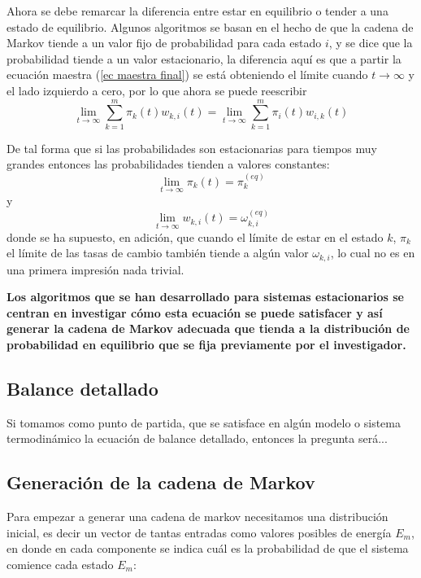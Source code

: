 \documentclass[12pt]{book}
\begin{document}
Ahora se debe remarcar la diferencia entre estar en equilibrio o tender a una estado de equilibrio. Algunos algoritmos se basan en el hecho de que la cadena de Markov tiende a un valor fijo de probabilidad para cada estado $i$, y se dice que la probabilidad tiende a un valor estacionario, la diferencia aquí es que a partir la ecuación maestra (\ref{ec maestra final}) se está obteniendo el límite  cuando $t \rightarrow \infty$ y el lado izquierdo a cero, por lo que ahora se puede reescribir
\begin{equation}
\lim_{t \rightarrow \infty}\sum_{k=1}^{m} \pi_{k}(t)  w_{k,i}(t) = \lim_{t \rightarrow \infty} \sum_{k=1}^{m} \pi_{i}(t)  w_{i,k}(t)
\end{equation}

De tal forma que si las probabilidades son estacionarias para tiempos muy grandes entonces las probabilidades tienden a valores constantes: 
\begin{equation}
	\lim_{t \rightarrow \infty}  \pi_{k}(t) = \pi_{k}^{(eq)}
\end{equation}
y
\begin{equation}
	\lim_{t \rightarrow \infty}  w_{k,i}(t) = \omega_{k,i}^{(eq)}
\end{equation}
donde se ha supuesto, en adición, que cuando el límite de estar en el estado $k$, $ \pi_{k}$ el límite de las tasas de cambio también tiende a algún valor $\omega_{k,i}$, lo cual no es en una primera impresión nada trivial.

\textbf{Los algoritmos que se han desarrollado para sistemas estacionarios se centran en investigar cómo esta ecuación se puede satisfacer y así generar la cadena de Markov adecuada que tienda a la distribución de probabilidad en equilibrio que se fija previamente por el investigador.}

\subsection{Balance detallado}

Si tomamos como punto de partida, que se  satisface en algún modelo o sistema termodinámico la ecuación de balance detallado, entonces la pregunta será...



\subsection{Generación de la cadena de Markov}
Para empezar a generar una cadena de markov necesitamos una distribución inicial, es decir un vector de tantas entradas como valores posibles de energía $E_{m}$, en donde en cada componente se indica cuál es la probabilidad de que el sistema comience cada estado $E_{m}$:
\end{document}
